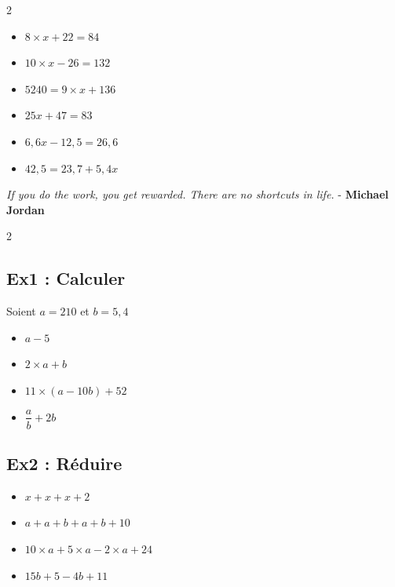 \begin{multicols}{2} 

\begin{itemize}[label={$\bullet$}]
  \item $ 8 \times x + 22 = 84 $ \\
  \item $ 10 \times x - 26 = 132 $ \\
  \item $ 5240 = 9 \times x + 136 $ \\ \columnbreak
  \item $ 25x + 47 = 83$ \\
  \item $ 6,6x - 12,5 = 26,6$ \\
  \item $ 42,5 = 23,7 + 5,4x$ \\
\end{itemize}
\end{multicols}

\vspace{1cm}


\begin{center}
  \textit{If you do the work, you get rewarded. There are no shortcuts in life.}  - \textbf{Michael Jordan}
\end{center}

\begin{multicols}{2} 

\subsection*{Ex1 : Calculer}
Soient $a = 210$ et $b = 5,4$ 

\begin{itemize}[label={$\bullet$}]
  \item $a - 5$ \\
  \item $2 \times a + b $ \\
  \item $11 \times  (a - 10b) + 52 $ \\
  \item $\dfrac{a}{b} + 2b $ 
\end{itemize} \columnbreak

\subsection*{Ex2 : Réduire}

\begin{itemize}[label={$\bullet$}]
  \item $x + x + x + 2 $ \\
  \item $a + a + b + a + b + 10 $ \\
  \item $10 \times  a + 5 \times  a - 2 \times a + 24$ \\
  \item $15b + 5 - 4b + 11 $ 
\end{itemize} 

\end{multicols}


